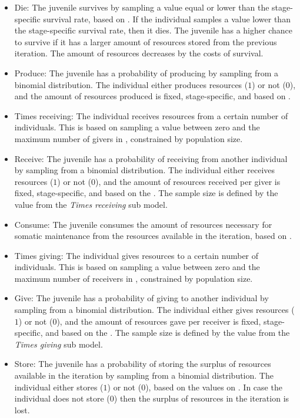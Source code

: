 \documentclass{article}
\begin{document}
\begin{itemize}
    \begin{itemize}
        \item Die: The juvenile survives by sampling a value equal or lower than the stage-specific survival rate, based on \cite{gurven2007longevity}. If the individual samples a value lower than the stage-specific survival rate, then it dies. The juvenile has a higher chance to survive if it has a larger amount of resources stored from the previous iteration. The amount of resources decreases by the costs of survival.
        \item Produce: The juvenile has a probability of producing by sampling from a binomial distribution. The individual either produces resources ($1$) or not ($0$), and the amount of resources produced is fixed, stage-specific, and based on \cite{koster2020life}.
        \item Times receiving: The individual receives resources from a certain number of individuals. This is based on sampling a value between zero and the maximum number of givers in \cite{gurven2004give}, constrained by population size.
        \item Receive: The juvenile has a probability of receiving from another individual by sampling from a binomial distribution. The individual either receives resources ($1$) or not ($0$), and the amount of resources received per giver is fixed, stage-specific, and based on the \cite{gurven2004give}. The sample size is defined by the value from the \emph{Times receiving} sub model. 
        \item Consume: The juvenile consumes the amount of resources necessary for somatic maintenance from the resources available in the iteration, based on \cite{kaplan2000theory,pontzer2021daily}.
        \item Times giving: The individual gives resources to a certain number of individuals. This is based on sampling a value between zero and the maximum number of receivers in \cite{gurven2004give}, constrained by population size.
        \item Give: The juvenile has a probability of giving to another individual by sampling from a binomial distribution. The individual either gives resources ($1$) or not ($0$), and the amount of resources gave per receiver is fixed, stage-specific, and based on the \cite{gurven2004give}. The sample size is defined by the value from the \emph{Times giving} sub model. 
        \item Store: The juvenile has a probability of storing the surplus of resources available in the iteration by sampling from a binomial distribution. The individual either stores ($1$) or not ($0$), based on the values on \citep{bowles2011cultivation}. In case the individual does not store ($0$) then the surplus of resources in the iteration is lost.

\end{itemize}
\end{itemize}
\end{document}
